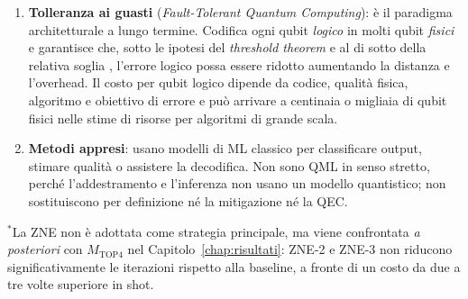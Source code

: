 \begin{onehalfspace}
\begin{enumerate}
    \item \textbf{Tolleranza ai guasti} (\textit{Fault-Tolerant Quantum Computing}): è il paradigma architetturale a lungo termine. Codifica ogni qubit \textit{logico} in molti qubit \textit{fisici} e garantisce che, sotto le ipotesi del \textit{threshold theorem} e al di sotto della relativa soglia \cite{aharonov1997fault}, l'errore logico possa essere ridotto aumentando la distanza e l'overhead. Il costo per qubit logico dipende da codice, qualità fisica, algoritmo e obiettivo di errore e può arrivare a centinaia o migliaia di qubit fisici nelle stime di risorse per algoritmi di grande scala.

    \item \textbf{Metodi appresi}: usano modelli di \ac{ML} classico per classificare output, stimare qualità o assistere la decodifica. Non sono \ac{QML} in senso stretto, perché l'addestramento e l'inferenza non usano un modello quantistico; non sostituiscono per definizione né la mitigazione né la QEC.
\end{enumerate}

\begin{table}[H]
\centering
{}
\caption{Confronto delle quattro strategie anti-rumore per il contesto di questa tesi.}
\label{tab:strategie_confronto}

\smallskip
{\footnotesize $^*$La ZNE non è adottata come strategia principale, ma viene confrontata \textit{a posteriori} con $M_{\text{TOP4}}$ nel Capitolo~\ref{chap:risultati}: ZNE-2 e ZNE-3 non riducono significativamente le iterazioni rispetto alla baseline, a fronte di un costo da due a tre volte superiore in shot.}
\end{table}


\end{onehalfspace}
